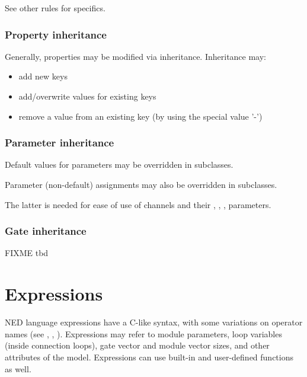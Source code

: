 See other rules for specifics.

\subsubsection{Property inheritance}

Generally, properties may be modified via inheritance. Inheritance may:

\begin{itemize}
    \item add new keys
    \item add/overwrite values for existing keys
    \item remove a value from an existing key (by using the special value '-')
\end{itemize}


\subsubsection{Parameter inheritance}

Default values for parameters may be overridden in subclasses.

Parameter (non-default) assignments may also be overridden in subclasses.

\begin{rationale}
    The latter is needed for ease of use of channels and their ,
    , ,  parameters.
\end{rationale}

\subsubsection{Gate inheritance}

FIXME tbd



\section{Expressions}
\label{ch-ned-ref:sec:expressions}

NED language expressions have a C-like syntax, with
some variations on operator names (see \ttt{\textasciicircum}, \ttt{\#}, \ttt{\#\#}).
Expressions may refer to module parameters, loop variables (inside connection
 loops), gate vector and module vector sizes, and other attributes
of the model. Expressions can use built-in and user-defined functions as well.

